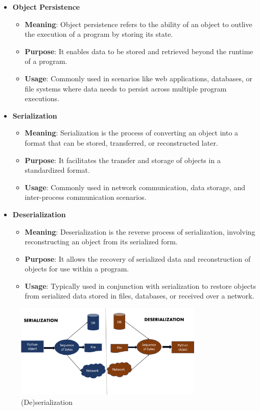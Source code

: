 \begin{itemize}
  \item \textbf{Object Persistence}
  \begin{itemize}
    \item \textbf{Meaning}: Object persistence refers to the ability of an object to outlive the execution of a program by storing its state.
    \item \textbf{Purpose}: It enables data to be stored and retrieved beyond the runtime of a program.
    \item \textbf{Usage}: Commonly used in scenarios like web applications, databases, or file systems where data needs to persist across multiple program executions.
  \end{itemize}
  
  \item \textbf{Serialization}
  \begin{itemize}
    \item \textbf{Meaning}: Serialization is the process of converting an object into a format that can be stored, transferred, or reconstructed later.
    \item \textbf{Purpose}: It facilitates the transfer and storage of objects in a standardized format.
    \item \textbf{Usage}: Commonly used in network communication, data storage, and inter-process communication scenarios.
  \end{itemize}
  
  \item \textbf{Deserialization}
  \begin{itemize}
    \item \textbf{Meaning}: Deserialization is the reverse process of serialization, involving reconstructing an object from its serialized form.
    \item \textbf{Purpose}: It allows the recovery of serialized data and reconstruction of objects for use within a program.
    \item \textbf{Usage}: Typically used in conjunction with serialization to restore objects from serialized data stored in files, databases, or received over a network.
  \end{itemize}
\end{itemize}

\begin{figure}[h!]
    \centering
    \includegraphics[width=0.8\textwidth]{images/serialization.png}
    \caption{(De)serialization}
    \label{fig:example-2}
\end{figure}

